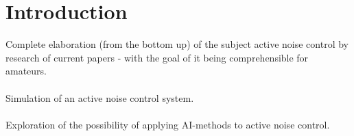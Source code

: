 \chapter{Introduction}
\label{chap:introduction}

Complete elaboration (from the bottom up) of the subject active noise control by research of current papers - with the goal of it being comprehensible for amateurs.
\\
\\
Simulation of an active noise control system.
\\
\\
Exploration of the possibility of applying AI-methods to active noise control.
\\
\\
